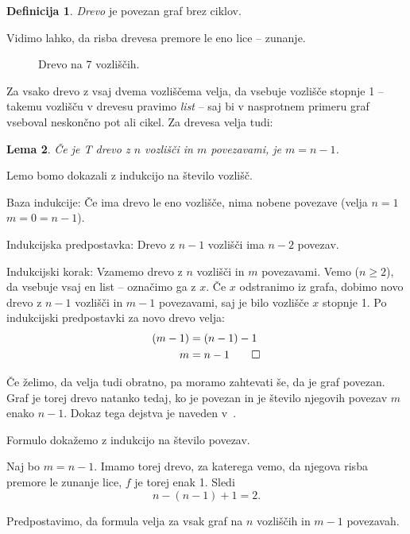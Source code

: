 \documentclass[12pt,a4paper]{amsart}
\theoremstyle{definition} %
\newtheorem{definicija}{Definicija}[section]
\theoremstyle{plain} %
\newtheorem{lema}[definicija]{Lema}
\begin{document}
\begin{definicija}
    \emph{Drevo} je povezan graf brez ciklov.
\end{definicija}

Vidimo lahko, da risba drevesa premore le eno lice -- zunanje.

\begin{figure}[h]
    \caption{Drevo na 7 vozliščih.}
\end{figure}

Za vsako drevo z vsaj dvema vozliščema velja, da vsebuje vozlišče stopnje 1 -- takemu vozlišču v drevesu pravimo \emph{list} -- saj bi v nasprotnem primeru graf vseboval neskončno pot ali cikel. Za drevesa velja tudi:

\begin{lema}
    Če je T drevo z $n$ vozlišči in $m$ povezavami, je $m=n-1$.
\end{lema}

\proof
    Lemo bomo dokazali z indukcijo na število vozlišč.
    
    Baza indukcije: Če ima drevo le eno vozlišče, nima nobene povezave (velja $n = 1$ $m = 0 = n-1$).
    
    Indukcijska predpostavka: Drevo z $n-1$ vozlišči ima $n-2$ povezav.
    
    Indukcijski korak: Vzamemo drevo z $n$ vozlišči in $m$ povezavami. Vemo ($n \geq 2$), da vsebuje vsaj en list -- označimo ga z $x$. Če $x$ odstranimo iz grafa, dobimo novo drevo z $n-1$ vozlišči in $m-1$ povezavami, saj je bilo vozlišče $x$ stopnje 1. Po indukcijski predpostavki za novo drevo velja:
    \begin{align*}
        (m-1) &= (n-1) - 1 \\
        m     &= n - 1 \qedhere
    \end{align*}
\endproof

Če želimo, da velja tudi obratno, pa moramo zahtevati še, da je graf povezan. Graf je torej drevo natanko tedaj, ko je povezan in je število njegovih povezav $m$ enako $n-1$. Dokaz tega dejstva je naveden v~\cite[str.~57]{bib:potocnik}.

    Formulo dokažemo z indukcijo na število povezav.
    
    Naj bo $m = n-1$. Imamo torej drevo, za katerega vemo, da njegova risba premore le zunanje lice, $f$ je torej enak 1. Sledi
    \[ n - (n-1) + 1 = 2. \]
    
    Predpostavimo, da formula velja za vsak graf na $n$ vozliščih in $m-1$ povezavah.
    
\end{document}
